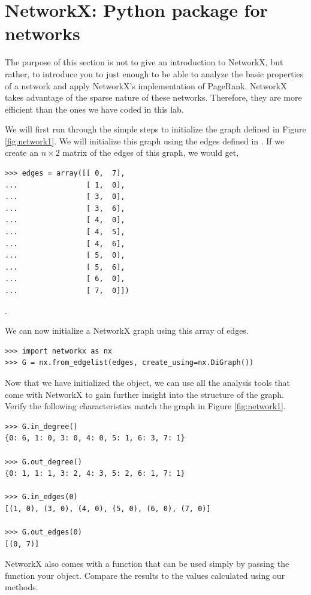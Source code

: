 \section*{NetworkX: Python package for networks}

The purpose of this section is not to give an introduction to NetworkX, but rather, to introduce you to just enough to be able to analyze the basic properties of a network and apply NetworkX's implementation of PageRank. NetworkX takes advantage of the sparse nature of these networks. Therefore, they are more efficient than the ones we have coded in this lab.

We will first run through the simple steps to initialize the graph defined in Figure \ref{fig:network1}. We will initialize this graph using the edges defined in . If we create an $n \times 2$ matrix of the edges of this graph, we would get,

\begin{lstlisting}
>>> edges = array([[ 0,  7],
...                [ 1,  0],
...                [ 3,  0],
...                [ 3,  6],
...                [ 4,  0],
...                [ 4,  5],
...                [ 4,  6],
...                [ 5,  0],
...                [ 5,  6],
...                [ 6,  0],
...                [ 7,  0]])
\end{lstlisting}.

We can now initialize a NetworkX graph using this array of edges.

\begin{lstlisting}
>>> import networkx as nx
>>> G = nx.from_edgelist(edges, create_using=nx.DiGraph())
\end{lstlisting}

Now that we have initialized the  object, we can use all the analysis tools that come with NetworkX to gain further insight into the structure of the graph. Verify the following characteristics match the graph in Figure \ref{fig:network1}.

\begin{lstlisting}
>>> G.in_degree()
{0: 6, 1: 0, 3: 0, 4: 0, 5: 1, 6: 3, 7: 1}

>>> G.out_degree()
{0: 1, 1: 1, 3: 2, 4: 3, 5: 2, 6: 1, 7: 1}

>>> G.in_edges(0)
[(1, 0), (3, 0), (4, 0), (5, 0), (6, 0), (7, 0)]

>>> G.out_edges(0)
[(0, 7)]
\end{lstlisting}

NetworkX also comes with a  function that can be used simply by passing the function your  object. Compare the results to the values calculated using our methods.

